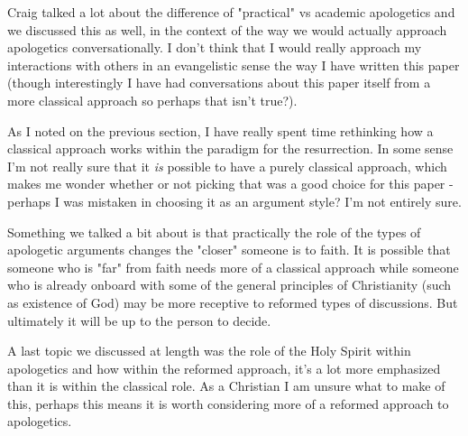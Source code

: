 \documentclass[12pt]{turabian-researchpaper}
\begin{document}
Craig talked a lot about the difference of "practical" vs academic apologetics and we discussed this as well, in the context of the way we would actually approach apologetics conversationally. I don't think that I would really approach my interactions with others in an evangelistic sense the way I have written this paper (though interestingly I have had conversations about this paper itself from a more classical approach so perhaps that isn't true?).

As I noted on the previous section, I have really spent time rethinking how a classical approach works within the paradigm for the resurrection. In some sense I'm not really sure that it \textit{is} possible to have a purely classical approach, which makes me wonder whether or not picking that was a good choice for this paper - perhaps I was mistaken in choosing it as an argument style? I'm not entirely sure.

Something we talked a bit about is that practically the role of the types of apologetic arguments changes the "closer" someone is to faith. It is possible that someone who is "far" from faith needs more of a classical approach while someone who is already onboard with some of the general principles of Christianity (such as existence of God) may be more receptive to reformed types of discussions. But ultimately it will be up to the person to decide.

A last topic we discussed at length was the role of the Holy Spirit within apologetics and how within the reformed approach, it's a lot more emphasized than it is within the classical role. As a Christian I am unsure what to make of this, perhaps this means it is worth considering more of a reformed approach to apologetics.



\newpage
\printbibliography
\end{document}
